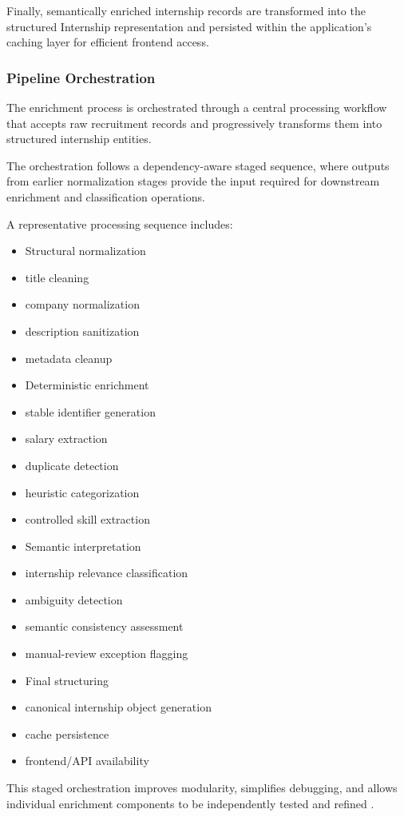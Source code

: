 Finally, semantically enriched internship records are transformed into the structured Internship representation and persisted within the application's caching layer for efficient frontend access.

\subsubsection*{Pipeline Orchestration}

The enrichment process is orchestrated through a central processing workflow that accepts raw recruitment records and progressively transforms them into structured internship entities.

The orchestration follows a dependency-aware staged sequence, where outputs from earlier normalization stages provide the input required for downstream enrichment and classification operations.

A representative processing sequence includes:
\begin{itemize}[leftmargin=1.4em,itemsep=0.25em,topsep=0.25em]
\item Structural normalization
\item title cleaning
\item company normalization
\item description sanitization
\item metadata cleanup
\item Deterministic enrichment
\item stable identifier generation
\item salary extraction
\item duplicate detection
\item heuristic categorization
\item controlled skill extraction
\item Semantic interpretation
\item internship relevance classification
\item ambiguity detection
\item semantic consistency assessment
\item manual-review exception flagging
\item Final structuring
\item canonical internship object generation
\item cache persistence
\item frontend/API availability
\end{itemize}
This staged orchestration improves modularity, simplifies debugging, and allows individual enrichment components to be independently tested and refined \cite{bass2012software, sommerville2016software}.

